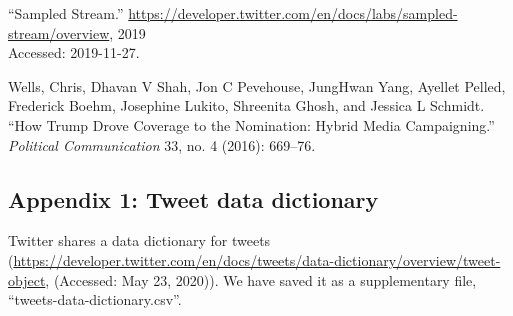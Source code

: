 \documentclass[
]{article}
\begin{document}
\leavevmode\hypertarget{ref-tweet_stream}{}%
``Sampled Stream.''
\url{https://developer.twitter.com/en/docs/labs/sampled-stream/overview},
2019\\
Accessed: 2019-11-27.

\leavevmode\hypertarget{ref-wells2016trump}{}%
Wells, Chris, Dhavan V Shah, Jon C Pevehouse, JungHwan Yang, Ayellet
Pelled, Frederick Boehm, Josephine Lukito, Shreenita Ghosh, and Jessica
L Schmidt. ``How Trump Drove Coverage to the Nomination: Hybrid Media
Campaigning.'' \emph{Political Communication} 33, no. 4 (2016): 669--76.

\newpage

\hypertarget{appendix-1-tweet-data-dictionary}{%
\subsection{Appendix 1: Tweet data
dictionary}\label{appendix-1-tweet-data-dictionary}}

Twitter shares a data dictionary for tweets
(\url{https://developer.twitter.com/en/docs/tweets/data-dictionary/overview/tweet-object},
(Accessed: May 23, 2020)). We have saved it as a supplementary file,
``tweets-data-dictionary.csv''.
\end{document}
